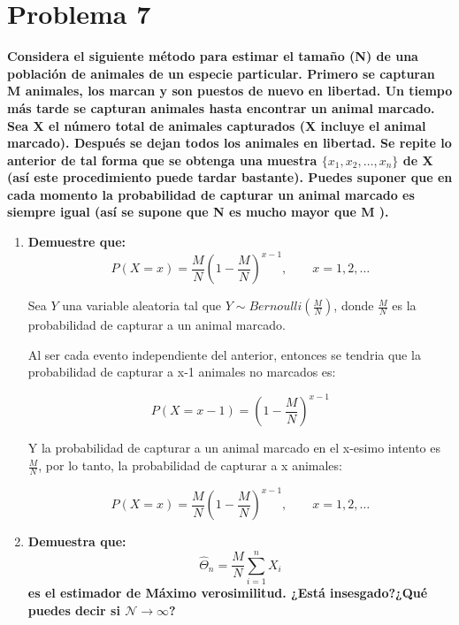 \section*{Problema 7}

\textbf{Considera el siguiente método para estimar el tamaño (N) de una población de animales de un especie particular. Primero se capturan M animales, los marcan y son puestos de nuevo en libertad. Un tiempo más tarde se capturan animales hasta encontrar un animal marcado. Sea X el número total de animales capturados (X incluye el animal marcado). Después se dejan todos los animales en libertad. Se repite lo anterior de tal forma que se obtenga una muestra $\{x_1,x_2,\dots,x_n\}$ de X (así este procedimiento puede tardar bastante). Puedes suponer que en cada momento la probabilidad de capturar un animal marcado es siempre igual (así se supone que N es mucho mayor que M ).
}

\begin{enumerate}
    \item \textbf{Demuestre que:}
          \begin{equation*}
              P(X=x) = \frac{M}{N} \left (1-\frac{M}{N}\right )^{x-1}, \qquad x=1,2,\dots
          \end{equation*}

          Sea $Y$ una variable aleatoria tal que $Y\sim Bernoulli\left (\frac{M}{N}\right )$, donde $\frac{M}{N}$ es la probabilidad de capturar a un animal marcado.

          Al ser cada evento independiente del anterior, entonces se tendria que la probabilidad de capturar a x-1 animales no marcados es:

          \begin{equation}
              P(X=x-1) = \left (1-\frac{M}{N}\right )^{x-1}
          \end{equation}

          Y la probabilidad de capturar a un animal marcado en el x-esimo intento es $\frac{M}{N}$, por lo tanto, la probabilidad de capturar a x animales:

          \begin{equation*}
              P(X=x) = \frac{M}{N} \left (1-\frac{M}{N}\right )^{x-1}, \qquad x=1,2,\dots
          \end{equation*}

    \item \textbf{Demuestra que:}
          \begin{equation*}
              \hat{\Theta}_n = \frac{M}{N} \sum_{i=1}^n X_i
          \end{equation*}
          \textbf{es el estimador de Máximo verosimilitud. ¿Está insesgado?¿Qué puedes decir si $\mathcal{N}\rightarrow \infty$?}
\end{enumerate}